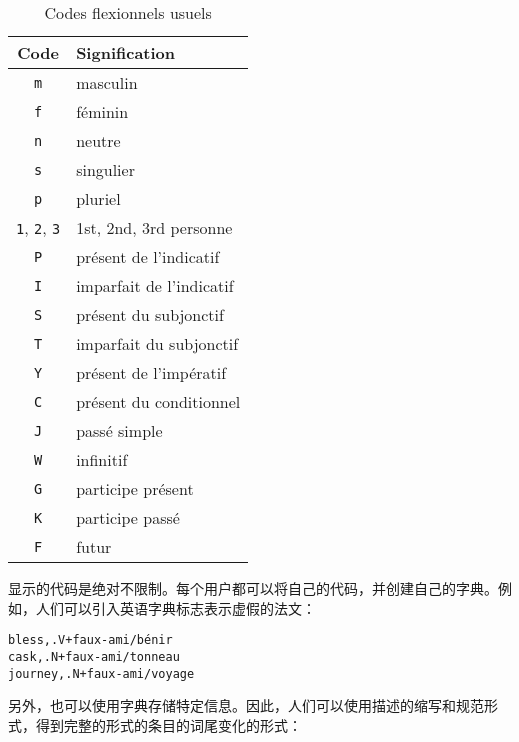 \begin{table}[!h]
\begin{center}
\begin{tabular}{|c|l|}
\hline
\textbf{Code} & \textbf{Signification} \\
\hline
\verb+m+ & masculin \\
\hline
\verb+f+ & féminin \\
\hline
\verb+n+ & neutre \\
\hline
\verb+s+ & singulier \\
\hline
\verb+p+ & pluriel \\
\hline
\verb+1+, \verb+2+, \verb+3+ & 1st, 2nd, 3rd personne\\
\hline
\verb+P+ & présent de l’indicatif \\
\hline
\verb+I+ & imparfait de l’indicatif  \\
\hline
\verb+S+ & présent du subjonctif\\
\hline
\verb+T+ & imparfait du subjonctif \\
\hline
\verb+Y+ & présent de l’impératif \\
\hline
\verb+C+ & présent du conditionnel\\
\hline
\verb+J+ & passé simple \\
\hline
\verb+W+ & infinitif \\
\hline
\verb+G+ & participe présent \\
\hline
\verb+K+ & participe passé \\
\hline
\verb+F+ & futur \\
\hline
\end{tabular}
\caption{Codes flexionnels usuels\label{tab-inflectional-codes}}
\end{center}
\end{table}


\bigskip
\noindent 显示的代码是绝对不限制。每个用户都可以将自己的代码，并创建自己的字典。例如，人们可以引入英语字典标志表示虚假的法文：

\bigskip
\begin{verbatim}
bless,.V+faux-ami/bénir
cask,.N+faux-ami/tonneau
journey,.N+faux-ami/voyage
\end{verbatim}

另外，也可以使用字典存储特定信息。因此，人们可以使用描述的缩写和规范形式，得到完整的形式的条目的词尾变化的形式：

